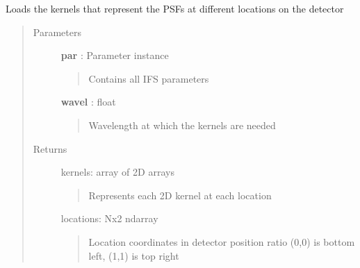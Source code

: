 \documentclass[letterpaper,10pt,english]{sphinxmanual}
\begin{document}

\begin{fulllineitems}
\label{tools:tools.spectrograph.loadKernels}
Loads the kernels that represent the PSFs at different locations on the detector
\begin{quote}\begin{description}
\item[{Parameters}] \leavevmode
\textbf{par} :   Parameter instance
\begin{quote}

Contains all IFS parameters
\end{quote}

\textbf{wavel} : float
\begin{quote}

Wavelength at which the kernels are needed
\end{quote}

\item[{Returns}] \leavevmode
kernels: array of 2D arrays
\begin{quote}

Represents each 2D kernel at each location
\end{quote}

locations: Nx2 ndarray
\begin{quote}

Location coordinates in detector position ratio (0,0) is bottom left, (1,1) is
top right
\end{quote}

\end{description}\end{quote}

\end{fulllineitems}

\end{document}
